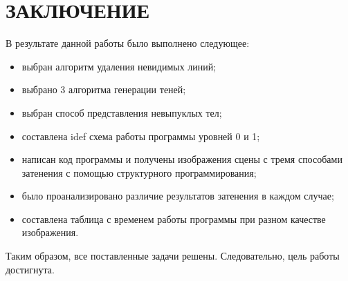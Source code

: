 \chapter*{ЗАКЛЮЧЕНИЕ}

В результате данной работы было выполнено следующее:
\begin{itemize}
    \item выбран алгоритм удаления невидимых линий;
    \item выбрано 3 алгоритма генерации теней;
    \item выбран способ представления невыпуклых тел;
    \item составлена idef схема работы программы уровней 0 и 1;
    \item написан код программы и получены изображения
    сцены с тремя способами затенения с помощью структурного программирования;
    \item было проанализировано различие результатов затенения в каждом случае;
    \item составлена таблица с временем работы программы
    при разном качестве изображения.
\end{itemize}
Таким образом, все поставленные задачи решены.
Следовательно, цель работы достигнута.